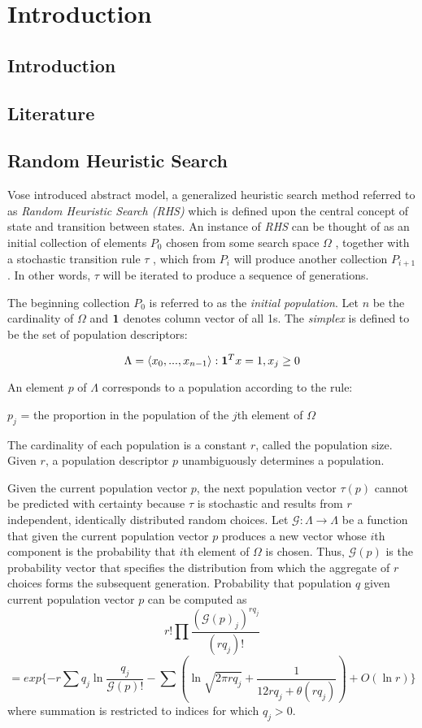 \chapter{Introduction} \label{ch:introduction}

\section{Introduction}
\section{Literature}
\section{Random Heuristic Search}
Vose \cite{Vose1999} introduced abstract model, a generalized heuristic search method referred to as {\em Random Heuristic Search (RHS)} which is defined upon the central concept of state and transition between states. An instance of {\em RHS} can be thought of as an initial collection of elements $P_0$ chosen from some search space $\Omega$ , together with a stochastic transition rule $\tau$ , which from $P_i$ will produce another collection $P_{i+1}$. In other words, $\tau$ will be iterated to produce a sequence of generations.

The beginning collection $P_0$ is referred to as the {\em initial population}. Let $n$ be the cardinality of $\Omega$ and ${\bf1}$ denotes column vector of all 1s. The {\em simplex} is defined to be the set of population descriptors:

\[
\Lambda = {\langle x_0,...,x_{n-1} \rangle : {\bf1}^T x=1, x_j \geq 0 }
\]

An element $p$ of $\Lambda$ corresponds to a population according to the rule:

$p_j$ = the proportion in the population of the $j$th element of $\Omega$

The cardinality of each population is a constant $r$, called the population size. Given $r$, a population descriptor $p$ unambiguously determines a population.

Given the current population vector $p$, the next population vector $\tau(p)$ cannot be predicted with certainty because $\tau$ is stochastic 
and results from $r$ independent, identically distributed random choices. Let $\mathcal{G}:\Lambda \rightarrow \Lambda$ be a function that given the current population vector $p$ produces a new vector whose $i$th component is the probability that $i$th element of $\Omega$ is chosen. Thus, $\mathcal{G}(p)$ is the probability vector that specifies the distribution from which the aggregate of $r$ choices forms the subsequent generation.
Probability that population $q$ given current population vector $p$ can be computed as \cite{Vose1999} 
\[
r! \prod \frac{(\mathcal{G}(p)_j)^{rq_j}}{(rq_j)!}
\]
\[
 = exp\{-r \sum q_j \ln \frac{q_j}{\mathcal{G}(p)!} - \sum (\ln \sqrt{2 \pi rq_j} + \frac{1}{12rq_j + \theta (rq_j)}) + O(\ln r)\}
\]
where summation is restricted to indices for which $q_j > 0$.

